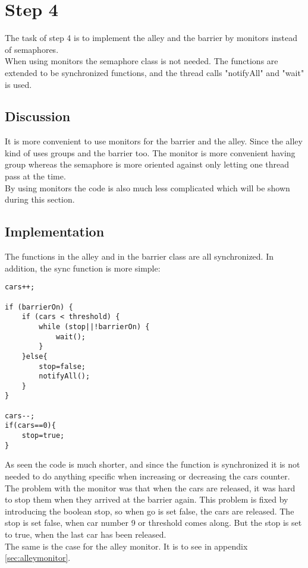 \section{Step 4}
The task of step 4 is to implement the alley and the barrier by monitors instead of semaphores. \\
When using monitors the semaphore class is not needed. The functions are extended to be synchronized functions, and the thread calls "notifyAll" and "wait" is used.

\subsection{Discussion}
It is more convenient to use monitors for the barrier and the alley. Since the alley kind of uses groups and the barrier too. The monitor is more convenient having group whereas the semaphore is more oriented against only letting one thread pass at the time. \\
By using monitors the code is also much less complicated which will be shown during this section.

\subsection{Implementation}
The functions in the alley and in the barrier class are all synchronized. In addition, the sync function is more simple: 

\begin{lstlisting}
cars++;

if (barrierOn) {
	if (cars < threshold) {
		while (stop||!barrierOn) {
			wait();	
		}
	}else{
		stop=false;
		notifyAll();
	}
} 

cars--;
if(cars==0){
	stop=true;
}
\end{lstlisting}
\vspace{.8cm}

As seen the code is much shorter, and since the function is synchronized it is not needed to do anything specific when increasing or decreasing the cars counter. The problem with the monitor was that when the cars are released, it was hard to stop them when they arrived at the barrier again. This problem is fixed by introducing the boolean stop, so when go is set false, the cars are released. The stop is set false, when car number 9 or threshold comes along. But the stop is set to true, when 
the last car has been released. 
\\

The same is the case for the alley monitor. It is to see in appendix \ref{sec:alleymonitor}.